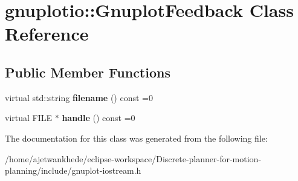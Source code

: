 \hypertarget{classgnuplotio_1_1GnuplotFeedback}{}\section{gnuplotio\+:\+:Gnuplot\+Feedback Class Reference}
\label{classgnuplotio_1_1GnuplotFeedback}
\subsection*{Public Member Functions}
\begin{DoxyCompactItemize}
\item 
\mbox{\label{classgnuplotio_1_1GnuplotFeedback_a081d4d59ffd81e2322c07c0a802e1307}} 
virtual std\+::string {\bfseries filename} () const =0
\item 
\mbox{\label{classgnuplotio_1_1GnuplotFeedback_a13ae87ba489bfbe87f64b8b54e8a4563}} 
virtual F\+I\+LE $\ast$ {\bfseries handle} () const =0
\end{DoxyCompactItemize}


The documentation for this class was generated from the following file\+:\begin{DoxyCompactItemize}
\item 
/home/ajetwankhede/eclipse-\/workspace/\+Discrete-\/planner-\/for-\/motion-\/planning/include/gnuplot-\/iostream.\+h\end{DoxyCompactItemize}
